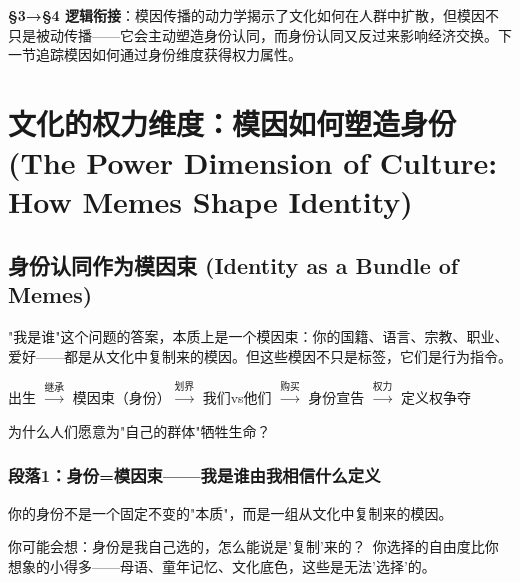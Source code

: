 \documentclass[../main.tex]{subfiles}
\begin{document}
	\textbf{§3→§4 逻辑衔接}：模因传播的动力学揭示了文化如何在人群中扩散，但模因不只是被动传播——它会主动塑造身份认同，而身份认同又反过来影响经济交换。下一节追踪模因如何通过身份维度获得权力属性。

	\section{文化的权力维度：模因如何塑造身份 (The Power Dimension of Culture: How Memes Shape Identity)}

	\subsection{身份认同作为模因束 (Identity as a Bundle of Memes)}

	\begin{motivation}

		"我是谁"这个问题的答案，本质上是一个模因束：你的国籍、语言、宗教、职业、爱好——都是从文化中复制来的模因。但这些模因不只是标签，它们是行为指令。

	\end{motivation}

	\begin{logicmap}

		出生 $\xrightarrow{\text{继承}}$ 模因束（身份）$\xrightarrow{\text{划界}}$ 我们vs他们 $\xrightarrow{\text{购买}}$ 身份宣告 $\xrightarrow{\text{权力}}$ 定义权争夺

	\end{logicmap}

	\begin{questionbox}

		为什么人们愿意为"自己的群体"牺牲生命？

	\end{questionbox}

	\subsubsection*{段落1：身份=模因束——我是谁由我相信什么定义}

	你的身份不是一个固定不变的"本质"，而是一组从文化中复制来的模因。

	\begin{tcolorbox}[colback=yellow!5, title=\textit{读者行为预测}]

		你可能会想：身份是我自己选的，怎么能说是'复制'来的？\ 你选择的自由度比你想象的小得多——母语、童年记忆、文化底色，这些是无法'选择'的。

	\end{tcolorbox}
\end{document}
